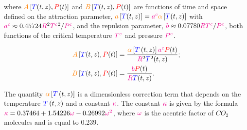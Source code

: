 \documentclass[../Article_Model_Parameters.tex]{subfiles}
\begin{document}
	where ${\color{orange}A}\left[{\color{blue}T}(t,z), {\color{red}P}(t)\right]$ and ${\color{orange}B}\left[{\color{blue}T}(t,z), {\color{red}P}(t)\right]$ are functions of time and space defined on the attraction parameter, ${\color{orange}a}\left[{\color{blue}T}(t,z)\right] = {\color{magenta}a^c}{\color{orange}\alpha}\left[{\color{blue}T}(t,z)\right]$ with ${\color{magenta}a^c} \approx 0.45724 {{\color{magenta}R}^2{\color{magenta}T^c}^2}/{{\color{magenta}P^c}}$, and the repulsion parameter, ${\color{magenta}b} \approx 0.07780 {{\color{magenta}R}{\color{magenta}T^c}}/{{\color{magenta}P^c}}$, both functions of the critical temperature ${\color{magenta}T^c}$ and pressure ${\color{magenta}P^c}$. 

	{\footnotesize
	\begin{subequations} \label{eq: PR_AB}
		\begin{align} 
			{\color{orange}A}\left[{\color{blue}T}(t,z), {\color{red}P}(t)\right]	& = \dfrac{{\color{orange}\alpha}\left[{\color{blue}T}\left(t,z\right)\right]{\color{magenta}a^c}{\color{red}P}(t)}{{\color{magenta}R}^2{\color{blue}T}^2(t,z)};													\label{eq: PR_A}\\
			{\color{orange}B}\left[{\color{blue}T}(t,z), {\color{red}P}(t)\right]	& = \dfrac{{\color{magenta}b}{\color{red}P}(t)}{{\color{magenta}R}{\color{blue}T}(t,z)}	\label{eq: PR_B}.
		\end{align}
	\end{subequations}}

	The quantity ${\color{orange}\alpha}\left[{\color{blue}T}\left(t,z\right)\right]$ is a dimensionless correction term that depends on the temperature ${\color{blue}T}\left(t,z\right)$ and a constant ${\color{magenta}\kappa}$. The constant ${\color{magenta}\kappa}$ is given by the formula ${\color{magenta}\kappa} = 0.37464 + 1.54226 {\color{magenta}\omega} - 0.26992 {\color{magenta}\omega^2}$, where ${\color{magenta}\omega}$ is the acentric factor of $CO_2$ molecules and is equal to 0.239.
	

	
\end{document}
